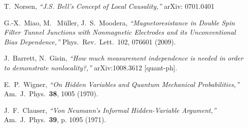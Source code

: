 \documentclass[12pt]{article}                    %
\begin{document}
\begin{thebibliography}{}
 T.~Norsen, {\it ``J.S. Bell's Concept of Local Causality,''} arXiv: 0701.0401

 G.-X.~Miao, M.~ M\"uller, J.~S.~Moodera, {\it ``Magnetoresistance in Double Spin Filter Tunnel Junctions with Nonmagnetic Electrodes and its Unconventional Bias Dependence,''}
Phys.\ Rev.\ Lett.\ 102, 076601 (2009).

 J.~Barrett, N.~Gisin, {\it ``How much measurement independence is needed in order to demonstrate nonlocality?,''} arXiv:1008.3612 [quant-ph].

  E.~P.~Wigner,
  {\it ``On Hidden Variables and Quantum Mechanical Probabilities,''} Am.\ J.\ Phys.\ {\bf 38}, 1005 (1970).
  
 J.~F.~Clauser, {\it ``Von Neumann's Informal Hidden-Variable Argument,''} Am.\ J.\ Phys.\ {\bf 39}, p. 1095 (1971).

\end{thebibliography}
\end{document}
